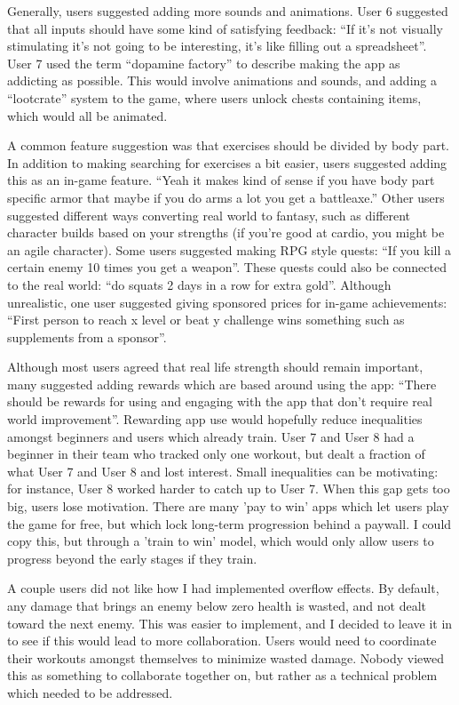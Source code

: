 \documentclass{l4proj}
\begin{document}
Generally, users suggested adding more sounds and animations. User 6 suggested that all inputs should have some kind of satisfying feedback: ``If it's not visually stimulating it's not going to be interesting, it's like filling out a spreadsheet''. User 7 used the term ``dopamine factory'' to describe making the app as addicting as possible. This would involve animations and sounds, and adding a ``lootcrate'' system to the game, where users unlock chests containing items, which would all be animated. 

A common feature suggestion was that exercises should be divided by body part. In addition to making searching for exercises a bit easier, users suggested adding this as an in-game feature. ``Yeah it makes kind of sense if you have body part specific armor that maybe if you do arms a lot you get a battleaxe.'' Other users suggested different ways converting real world to fantasy, such as different character builds based on your strengths (if you're good at cardio, you might be an agile character). Some users suggested making RPG style quests: ``If you kill a certain enemy 10 times you get a weapon''. These quests could also be connected to the real world: ``do squats 2 days in a row for extra gold''. Although unrealistic, one user suggested giving sponsored prices for in-game achievements: ``First person to reach x level or beat y challenge wins something such as supplements from a sponsor''.

Although most users agreed that real life strength should remain important, many suggested adding rewards which are based around using the app: ``There should be rewards for using and engaging with the app that don't require real world improvement''. Rewarding app use would hopefully reduce inequalities amongst beginners and users which already train.  User 7 and User 8 had a beginner in their team who tracked only one workout, but dealt a fraction of what User 7 and User 8 and lost interest. Small inequalities can be motivating: for instance, User 8 worked harder to catch up to User 7. When this gap gets too big, users lose motivation. There are many 'pay to win' apps which let users play the game for free, but which lock long-term progression behind a paywall. I could copy this, but through a 'train to win' model, which would only allow users to progress beyond the early stages if they train. 

A couple users did not like how I had implemented overflow effects. By default, any damage that brings an enemy below zero health is wasted, and not dealt toward the next enemy. This was easier to implement, and I decided to leave it in to see if this would lead to more collaboration. Users would need to coordinate their workouts amongst themselves to minimize wasted damage. Nobody viewed this as something to collaborate together on, but rather as a technical problem which needed to be addressed.
\end{document}
